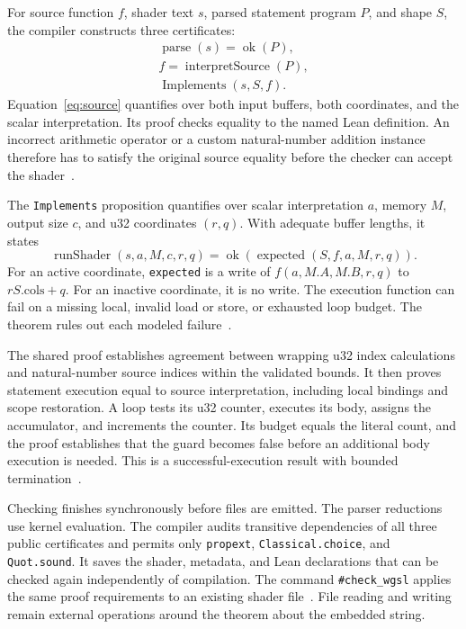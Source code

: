 \documentclass[11pt]{article}
\newcommand{\code}[1]{\texttt{#1}}
\begin{document}
For source function $f$, shader text $s$, parsed statement program $P$, and shape $S$, the compiler constructs three certificates:
\begin{gather}
\operatorname{parse}(s)=\operatorname{ok}(P),\label{eq:parse}\\
f=\operatorname{interpretSource}(P),\label{eq:source}\\
\operatorname{Implements}(s,S,f).\label{eq:implements}
\end{gather}
Equation~\eqref{eq:source} quantifies over both input buffers, both coordinates, and the scalar interpretation.  Its proof checks equality to the named Lean definition.  An incorrect arithmetic operator or a custom natural-number addition instance therefore has to satisfy the original source equality before the checker can accept the shader~\cite{compiler}.

The \code{Implements} proposition quantifies over scalar interpretation $a$, memory $M$, output size $c$, and u32 coordinates $(r,q)$.  With adequate buffer lengths, it states
\[
\operatorname{runShader}(s,a,M,c,r,q)
=\operatorname{ok}(\operatorname{expected}(S,f,a,M,r,q)).
\]
For an active coordinate, \code{expected} is a write of $f(a,M.A,M.B,r,q)$ to $rS.\mathrm{cols}+q$.  For an inactive coordinate, it is no write.  The execution function can fail on a missing local, invalid load or store, or exhausted loop budget.  The theorem rules out each modeled failure~\cite{execution}.

The shared proof establishes agreement between wrapping u32 index calculations and natural-number source indices within the validated bounds.  It then proves statement execution equal to source interpretation, including local bindings and scope restoration.  A loop tests its u32 counter, executes its body, assigns the accumulator, and increments the counter.  Its budget equals the literal count, and the proof establishes that the guard becomes false before an additional body execution is needed.  This is a successful-execution result with bounded termination~\cite{execution}.

Checking finishes synchronously before files are emitted.  The parser reductions use kernel evaluation.  The compiler audits transitive dependencies of all three public certificates and permits only \code{propext}, \code{Classical.choice}, and \code{Quot.sound}.  It saves the shader, metadata, and Lean declarations that can be checked again independently of compilation.  The command \code{\#check\_wgsl} applies the same proof requirements to an existing shader file~\cite{compiler}.  File reading and writing remain external operations around the theorem about the embedded string.
\end{document}
